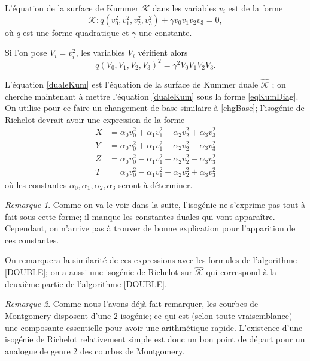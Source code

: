 \documentclass[a4paper,12pt]{article}
\theoremstyle{definition}
\theoremstyle{remark}
\newtheorem{remarque}{Remarque}
\numberwithin{equation}{section}
\begin{document}
L'équation de la surface de Kummer $\mathcal{K}$ dans les variables $v_i$ est de la forme \citep{cassels-Flynn}
\begin{equation}
\label{eqKumDiag}
\mathcal{K} : q(v_0^2,v_1^2,v_2^2,v_3^2)+\gamma v_0v_1v_2v_3 = 0,
\end{equation}
où $q$ est une forme quadratique et $\gamma$ une constante.

Si l'on pose $V_i = v_i^2$, les variables $V_i$ vérifient alors
\begin{equation}
\label{dualeKum}
q(V_0,V_1,V_2,V_3)^2 = \gamma^2 V_0V_1V_2V_3.
\end{equation}

L'équation \ref{dualeKum} est l'équation de la surface de Kummer duale $\hat{\mathcal{K}}$ \citep{cassels-Flynn}; on cherche maintenant à mettre l'équation \ref{dualeKum} sous la forme \ref{eqKumDiag}. On utilise pour ce faire un changement de base similaire à \ref{chgBase}; l'isogénie de Richelot devrait avoir une expression de la forme
\begin{align*}
X &= \alpha_0v_0^2+\alpha_1v_1^2+\alpha_2v_2^2+\alpha_3v_3^2 \\
Y &= \alpha_0v_0^2+\alpha_1v_1^2-\alpha_2v_2^2-\alpha_3v_3^2 \\
Z &= \alpha_0v_0^2-\alpha_1v_1^2+\alpha_2v_2^2-\alpha_3v_3^2 \\
T &= \alpha_0v_0^2-\alpha_1v_1^2-\alpha_2v_2^2+\alpha_3v_3^2
\end{align*}
où les constantes $\alpha_0,\alpha_1,\alpha_2,\alpha_3$ seront à déterminer.

\begin{remarque}
Comme on va le voir dans la suite, l'isogénie ne s'exprime pas tout à fait sous cette forme; il manque les constantes duales qui vont apparaître. Cependant, on n'arrive pas à trouver de bonne explication pour l'apparition de ces constantes.
\end{remarque}

On remarquera la similarité de ces expressions avec les formules de l'algorithme \ref{DOUBLE}; on a aussi une isogénie de Richelot sur $\hat{\mathcal{K}}$ qui correspond à la deuxième partie de l'algorithme \ref{DOUBLE}.

\begin{remarque}
Comme nous l'avons déjà fait remarquer, les courbes de Montgomery disposent d'une 2-isogénie; ce qui est (selon toute vraisemblance) une composante essentielle pour avoir une arithmétique rapide.
L'existence d'une isogénie de Richelot relativement simple est donc un bon point de départ pour un analogue de genre 2 des courbes de Montgomery.
\end{remarque}
\end{document}
